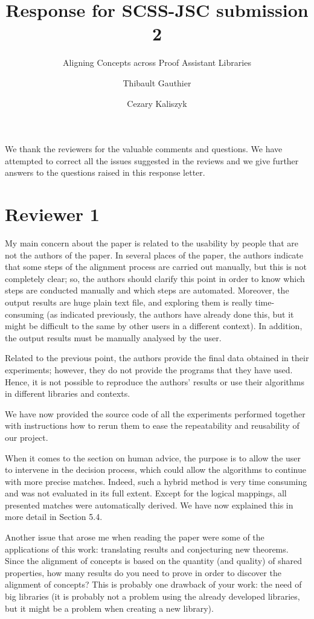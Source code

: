 \documentclass[]{scrartcl}
\title{Response for SCSS-JSC submission 2}
\subtitle{Aligning Concepts across Proof Assistant
Libraries}
\author{Thibault Gauthier \and Cezary Kaliszyk}
\begin{document}
\maketitle

We thank the reviewers for the valuable comments and questions. We have 
attempted to correct all
the issues suggested in the reviews and we give further answers to the 
questions raised in this response letter.

\section*{Reviewer 1}

\begin{leftbar}
My main concern about the paper is related to the usability by people that are 
not the authors of the paper. In several places of the paper, the authors 
indicate that some steps of the alignment process are carried out manually, but 
this is not completely clear; so, the authors should clarify this point in 
order to know which steps are conducted manually and which steps are automated. 
Moreover, the output results are huge plain text file, and exploring them is 
really time-consuming (as indicated previously, the authors have already done 
this, but it might be difficult to the same by other users in a different 
context). In addition, the output results must be manually analysed by the user.

Related to the previous point, the authors provide the final data obtained in 
their
experiments; however, they do not provide the programs that they have used. 
Hence, it is not possible to reproduce the authors' results or use their 
algorithms in different libraries and contexts.
\end{leftbar}


We have now provided the source code of all the experiments performed together 
with instructions how to rerun them
to ease the repeatability and reusability of our project.

When it comes to the section on human advice, the purpose is to allow the user 
to intervene in the decision process,
which could allow the algorithms to continue with more precise matches. Indeed, 
such a hybrid method is very
time consuming and was not evaluated in its full extent.
Except for the logical mappings, all presented matches were automatically 
derived.
We have now explained this in more detail in Section 5.4.

\begin{leftbar}Another issue that arose me when reading the paper were some of 
the applications of this work: translating results and conjecturing new 
theorems. Since the alignment of concepts is based on the quantity (and 
quality) of shared properties, how many results do you need to prove in order 
to discover the alignment of concepts? This is probably one drawback of your 
work: the need of big libraries (it is probably not a problem using the already 
developed libraries, but it might be a problem when creating a new library).
\end{leftbar}
\end{document}
